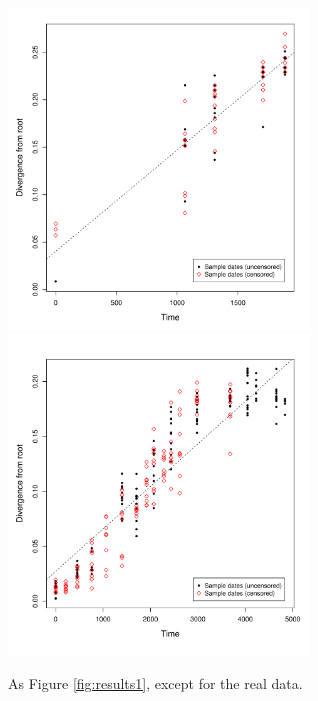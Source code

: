 \documentclass[12pt]{article}
\begin{document}
\begin{figure}[ht]
	\centering
	\includegraphics[width=8cm]{figures/ancre.pdf}
	\includegraphics[width=8cm]{figures/lanl.pdf}
	\caption[Examples]{As Figure \ref{fig:results1}, except for the real data.}
	\label{fig:results2}
\end{figure}
\end{document}
